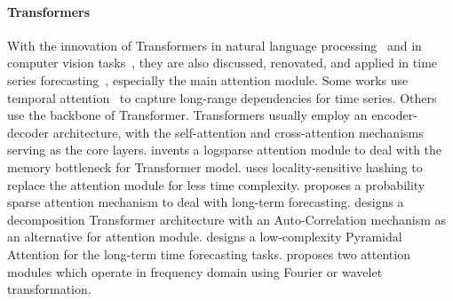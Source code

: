 \documentclass{article}
\begin{document}
\paragraph{Transformers}
With the innovation of Transformers in natural language processing~\cite{attention_is_all_you_need,Bert/NAACL/Jacob} and in computer vision tasks~\cite{Transformers-for-image-at-scale/iclr/DosovitskiyB0WZ21,DBLP:Global-filter-FNO-in-cv}, they are also discussed, renovated, and applied in time series forecasting~\cite{wen2022transformers}, especially the main attention module. Some works use temporal attention~\cite{dual-state-attention-rnn-qin} to capture long-range dependencies for time series. Others use the backbone of Transformer. Transformers usually employ an encoder-decoder architecture, with the self-attention and cross-attention mechanisms serving as the core layers. \cite{Log-transformer-shiyang-2019} invents a logsparse attention module to deal with the memory bottleneck for Transformer model. \cite{DBLP:conf/iclr/KitaevKL20-reformer} uses locality-sensitive
hashing to replace the attention module for less time complexity. \cite{haoyietal-informer-2021} proposes a probability sparse attention mechanism to deal with long-term forecasting. \cite{Autoformer} designs a decomposition Transformer architecture with an Auto-Correlation mechanism as an alternative for attention module. \cite{liu2022pyraformer} designs a low-complexity Pyramidal Attention for the long-term time forecasting tasks. \cite{FedFormer} proposes two attention modules which operate in frequency domain using Fourier or wavelet transformation. 
\end{document}
